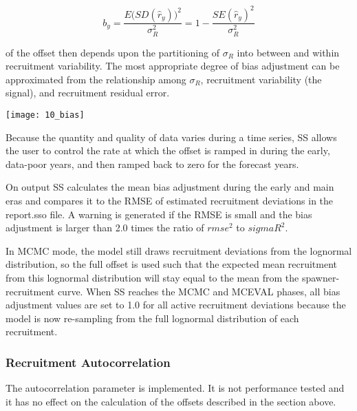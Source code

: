 \begin{equation}
	b_y=\frac{E\Big( SD(\hat{r}_y)\Big)^2}{\sigma^2_R}=1-\frac{SE(\hat{r}_y)^2}{\sigma^2_R}
\end{equation}

\noindent of the offset then depends upon the partitioning of $\sigma_R$ into between and within recruitment variability.  The most appropriate degree of bias adjustment can be approximated from the relationship among $\sigma_R$, recruitment variability (the signal), and recruitment residual error.

\begin{center}
	\texttt{[image: 10\_bias]}
\end{center}

Because the quantity and quality of data varies during a time series, SS allows the user to control the rate at which the offset is ramped in during the early, data-poor years, and then ramped back to zero for the forecast years.

On output SS calculates the mean bias adjustment during the early and main eras and compares it to the RMSE of estimated recruitment deviations in the report.sso file. A warning is generated if the RMSE is small and the bias adjustment is larger than 2.0 times the ratio of $rmse^2$ to $sigmaR^2$.

In MCMC mode, the model still draws recruitment deviations from the lognormal distribution, so the full offset is used such that the expected mean recruitment from this lognormal distribution will stay equal to the mean from the spawner-recruitment curve. When SS reaches the MCMC and MCEVAL phases, all bias adjustment values are set to 1.0 for all active recruitment deviations because the model is now re-sampling from the full lognormal distribution of each recruitment.

\subsubsection{Recruitment Autocorrelation}
The autocorrelation parameter is implemented. It is not performance tested and it has no effect on the calculation of the offsets described in the section above.


